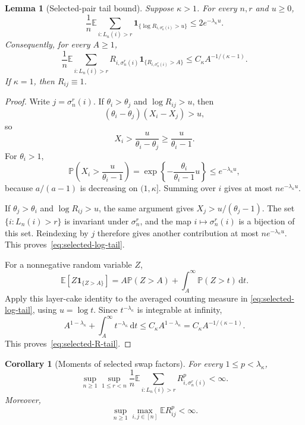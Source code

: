 \documentclass[11pt]{article}
\newcommand{\E}{\mathbb E}
\newcommand{\Pp}{\mathbb P}
\newcommand{\1}{\mathbf 1}
\newcommand{\dd}{\,\mathrm d}
\newtheorem{lemma}[theorem]{Lemma}
\newtheorem{corollary}[theorem]{Corollary}
\theoremstyle{definition}
\theoremstyle{remark}
\begin{document}
\begin{lemma}[Selected-pair tail bound]
\label{lem:selected-tail}
Suppose $\kappa>1$.  For every $n,r$ and $u\geq0$,
\begin{equation}\label{eq:selected-log-tail}
 \frac1n\E\sum_{i:L_n(i)>r}
 \1_{\{\log R_{i,\sigma_n^r(i)}>u\}}
 \leq 2e^{-\lambda_\kappa u}.
\end{equation}
Consequently, for every $A\geq1$,
\begin{equation}\label{eq:selected-R-tail}
 \frac1n\E\sum_{i:L_n(i)>r}
 R_{i,\sigma_n^r(i)}
 \1_{\{R_{i,\sigma_n^r(i)}>A\}}
 \leq C_\kappa A^{-1/(\kappa-1)}.
\end{equation}
If $\kappa=1$, then $R_{ij}\equiv1$.
\end{lemma}

\begin{proof}
Write $j=\sigma_n^r(i)$.  If $\theta_i>\theta_j$ and
$\log R_{ij}>u$, then
\[
  (\theta_i-\theta_j)(X_i-X_j)>u,
\]
so
\[
  X_i>\frac{u}{\theta_i-\theta_j}
      \geq \frac{u}{\theta_i-1}.
\]
For $\theta_i>1$,
\[
 \Pp\left(X_i>\frac{u}{\theta_i-1}\right)
 =\exp\left\{-\frac{\theta_i}{\theta_i-1}u\right\}
 \leq e^{-\lambda_\kappa u},
\]
because $a/(a-1)$ is decreasing on $(1,\kappa]$.  Summing over $i$
gives at most $ne^{-\lambda_\kappa u}$.

If $\theta_j>\theta_i$ and $\log R_{ij}>u$, the same argument gives
$X_j>u/(\theta_j-1)$.  The set
$\{i:L_n(i)>r\}$ is invariant under $\sigma_n^r$, and the map
$i\mapsto\sigma_n^r(i)$ is a bijection of this set.  Reindexing by $j$
therefore gives another contribution at most
$ne^{-\lambda_\kappa u}$.  This proves~\eqref{eq:selected-log-tail}.

For a nonnegative random variable $Z$,
\[
  \E[Z\1_{\{Z>A\}}]
  =A\Pp(Z>A)+\int_A^\infty\Pp(Z>t)\dd t.
\]
Apply this layer-cake identity to the averaged counting measure in
\eqref{eq:selected-log-tail}, using $u=\log t$.  Since
$t^{-\lambda_\kappa}$ is integrable at infinity,
\[
 A^{1-\lambda_\kappa}
 +\int_A^\infty t^{-\lambda_\kappa}\dd t
 \leq C_\kappa A^{1-\lambda_\kappa}
 =C_\kappa A^{-1/(\kappa-1)}.
\]
This proves~\eqref{eq:selected-R-tail}.
\end{proof}

\begin{corollary}[Moments of selected swap factors]
\label{cor:selected-moments}
For every $1\leq p<\lambda_\kappa$,
\begin{equation}\label{eq:selected-p-moment}
 \sup_{n\geq1}\sup_{1\leq r<n}
 \frac1n\E\sum_{i:L_n(i)>r}R_{i,\sigma_n^r(i)}^p
 <\infty.
\end{equation}
Moreover,
\begin{equation}\label{eq:independent-p-moment}
 \sup_{n\geq1}\max_{i,j\in[n]}\E R_{ij}^p<\infty.
\end{equation}
\end{corollary}
\end{document}
